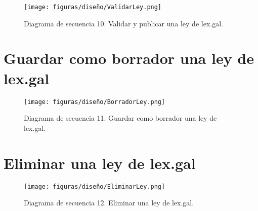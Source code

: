 \begin{figure}[H]
\centerline{\texttt{[image: figuras/diseño/ValidarLey.png]}}
\caption{Diagrama de secuencia 10. Validar y publicar una ley de lex.gal.}
\label{enlaceDBorradorLEXGAL}
\end{figure}


\section{Guardar como borrador una ley de lex.gal}

\begin{figure}[H]
\centerline{\texttt{[image: figuras/diseño/BorradorLey.png]}}
\caption{Diagrama de secuencia 11. Guardar como borrador una ley de lex.gal.}
\label{enlaceDValidarLEXGAL}
\end{figure}


\section{Eliminar una ley de lex.gal}

\begin{figure}[H]
\centerline{\texttt{[image: figuras/diseño/EliminarLey.png]}}
\caption{Diagrama de secuencia 12. Eliminar una ley de lex.gal.}
\label{enlaceDEliminarLEXGAL}
\end{figure}